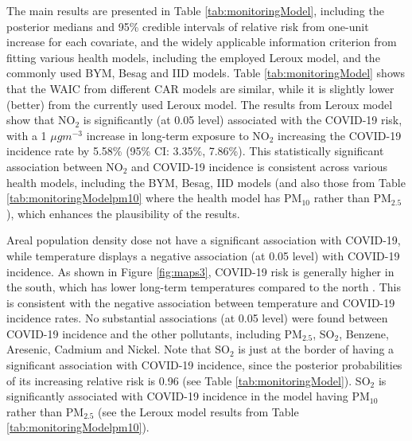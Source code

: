 \documentclass[12,]{article}
\begin{document}
The main results are presented in Table \ref{tab:monitoringModel},
including the posterior medians and 95\% credible intervals of relative
risk from one-unit increase for each covariate, and the widely
applicable information criterion \autocite[WAIC,][]{Watanabe2010} from
fitting various health models, including the employed Leroux model, and
the commonly used BYM, Besag and IID models. Table
\ref{tab:monitoringModel} shows that the WAIC from different CAR models
are similar, while it is slightly lower (better) from the currently used
Leroux model. The results from Leroux model show that NO\(_2\) is
significantly (at 0.05 level) associated with the COVID-19 risk, with a
1 \(\mu gm^{-3}\) increase in long-term exposure to NO\(_2\) increasing
the COVID-19 incidence rate by 5.58\% (95\% CI: 3.35\%, 7.86\%). This
statistically significant association between NO\(_2\) and COVID-19
incidence is consistent across various health models, including the BYM,
Besag, IID models (and also those from Table
\ref{tab:monitoringModelpm10} where the health model has PM\(_{10}\)
rather than PM\(_{2.5}\)), which enhances the plausibility of the
results.

Areal population density dose not have a significant association with
COVID-19, while temperature displays a negative association (at 0.05
level) with COVID-19 incidence. As shown in Figure \ref{fig:maps3},
COVID-19 risk is generally higher in the south, which has lower
long-term temperatures compared to the north
\autocite[see][]{mapsofworld2020}. This is consistent with the negative
association between temperature and COVID-19 incidence rates. No
substantial associations (at 0.05 level) were found between COVID-19
incidence and the other pollutants, including PM\(_{2.5}\), SO\(_2\),
Benzene, Aresenic, Cadmium and Nickel. Note that SO\(_2\) is just at the
border of having a significant association with COVID-19 incidence,
since the posterior probabilities of its increasing relative risk is
0.96 (see Table \ref{tab:monitoringModel}). SO\(_2\) is significantly
associated with COVID-19 incidence in the model having PM\(_{10}\)
rather than PM\(_{2.5}\) (see the Leroux model results from Table
\ref{tab:monitoringModelpm10}).

\end{document}
